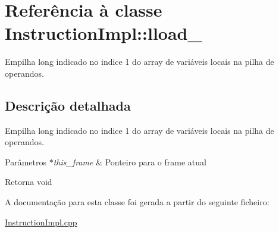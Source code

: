 \hypertarget{class_instruction_impl_1_1lload__1}{}\section{Referência à classe Instruction\+Impl\+:\+:lload\+\_}
\label{class_instruction_impl_1_1lload__1}


Empilha long indicado no indice 1 do array de variáveis locais na pilha de operandos.  




\subsection{Descrição detalhada}
Empilha long indicado no indice 1 do array de variáveis locais na pilha de operandos. 


\begin{DoxyParams}{Parâmetros}
{\em $\ast$this\+\_\+frame} & Ponteiro para o frame atual \\
\hline
\end{DoxyParams}
\begin{DoxyReturn}{Retorna}
void 
\end{DoxyReturn}


A documentação para esta classe foi gerada a partir do seguinte ficheiro\+:\begin{DoxyCompactItemize}
\item 
\hyperlink{_instruction_impl_8cpp}{Instruction\+Impl.\+cpp}\end{DoxyCompactItemize}
